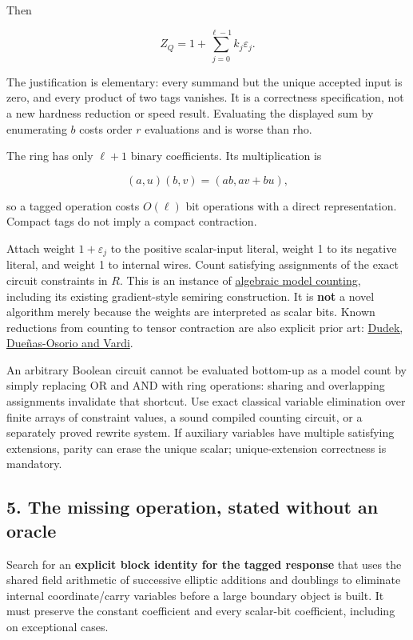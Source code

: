 \documentclass[
  10pt,
]{article}
\begin{document}
Then

\[
Z_Q=1+\sum_{j=0}^{\ell-1}k_j\varepsilon_j.
\]

The justification is elementary: every summand but the unique accepted
input is zero, and every product of two tags vanishes. It is a
correctness specification, not a new hardness reduction or speed result.
Evaluating the displayed sum by enumerating \(b\) costs order \(r\)
evaluations and is worse than rho.

The ring has only \(\ell+1\) binary coefficients. Its multiplication is

\[
(a,u)(b,v)=(ab,av+bu),
\]

so a tagged operation costs \(O(\ell)\) bit operations with a direct
representation. Compact tags do not imply a compact contraction.

Attach weight \(1+\varepsilon_j\) to the positive scalar-input literal,
weight 1 to its negative literal, and weight 1 to internal wires. Count
satisfying assignments of the exact circuit constraints in \(R\). This
is an instance of \href{https://arxiv.org/html/1211.4475}{algebraic
model counting}, including its existing gradient-style semiring
construction. It is \textbf{not} a novel algorithm merely because the
weights are interpreted as scalar bits. Known reductions from counting
to tensor contraction are also explicit prior art:
\href{https://arxiv.org/abs/1908.04381}{Dudek, Dueñas-Osorio and Vardi}.

An arbitrary Boolean circuit cannot be evaluated bottom-up as a model
count by simply replacing OR and AND with ring operations: sharing and
overlapping assignments invalidate that shortcut. Use exact classical
variable elimination over finite arrays of constraint values, a sound
compiled counting circuit, or a separately proved rewrite system. If
auxiliary variables have multiple satisfying extensions, parity can
erase the unique scalar; unique-extension correctness is mandatory.

\subsection{5. The missing operation, stated without an
oracle}\label{the-missing-operation-stated-without-an-oracle}

Search for an \textbf{explicit block identity for the tagged response}
that uses the shared field arithmetic of successive elliptic additions
and doublings to eliminate internal coordinate/carry variables before a
large boundary object is built. It must preserve the constant
coefficient and every scalar-bit coefficient, including on exceptional
cases.
\end{document}
